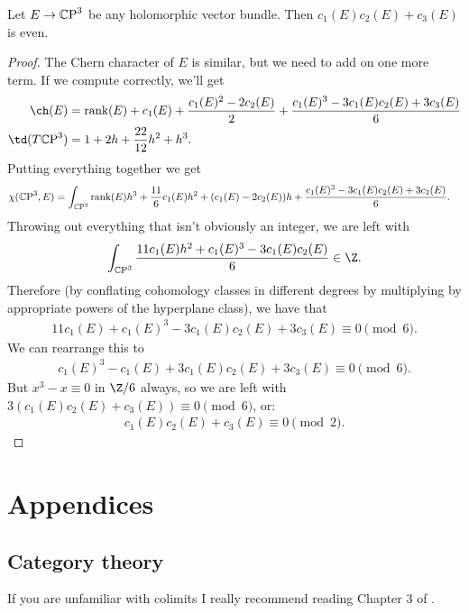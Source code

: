 \documentclass[11pt]{book}
\begin{document}
\begin{example} Let $E \to {\mathbb{C}\text{P}}^3$ be any holomorphic vector bundle. Then $c_1(E)c_2(E) + c_3(E)$ is even.
\end{example}
\begin{proof} The Chern character of $E$ is similar, but we need to add on one more term. If we compute correctly, we'll get
\begin{align*}
    \ch(E) &= \text{rank}(E) + c_1(E) + \frac{c_1(E)^2 - 2c_2(E)}{2} + \frac{c_1(E)^3 - 3c_1(E) c_2(E) + 3c_3(E)}{6} \\
    \td(T\CP^3) &= 1 + 2h + \frac{22}{12}h^2 + h^3.
\end{align*}
Putting everything together we get
\begin{align*}
    \chi({\mathbb{C}\text{P}}^3,E) &= \int_{{\mathbb{C}\text{P}}^3} \text{rank}(E) h^3 + \frac{11}{6}c_1(E)h^2 + (c_1(E) - 2c_2(E))h + \frac{c_1(E)^3- 3c_1(E) c_2(E) + 3c_3(E)}{6}.
\end{align*}
Throwing out everything that isn't obviously an integer, we are left with
\begin{align*}
    \int_{\CP^3} \frac{11c_1(E)h^2 + c_1(E)^3 - 3c_1(E)c_2(E)}{6} \in \Z.
\end{align*}
Therefore (by conflating cohomology classes in different degrees by multiplying by appropriate powers of the hyperplane class), we have that
\begin{align*}
    11c_1(E) + c_1(E)^3 - 3c_1(E) c_2(E) + 3c_3(E)\equiv 0 \pmod{6}.
\end{align*}
We can rearrange this to
\begin{align*}
    c_1(E)^3 - c_1(E) + 3c_1(E) c_2(E) + 3c_3(E) \equiv 0 \pmod{6}.
\end{align*}
But $x^3 - x \equiv 0$ in $\Z/6$ always, so we are left with $3(c_1(E) c_2(E)+c_3(E)) \equiv 0 \pmod{6}$, or:
\begin{align*}
    c_1(E) c_2(E) + c_3(E)\equiv 0 \pmod{2}.
\end{align*}
\end{proof}







\newpage
\appendix
\chapter{Appendices}
\minitoc
\section{Category theory}
If you are unfamiliar with colimits I really recommend reading Chapter 3 of \cite{riehlCategoryTheoryContext2016}.
\end{document}
